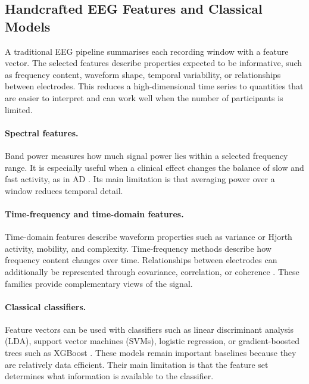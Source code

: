 \subsection{Handcrafted EEG Features and Classical Models}\label{sec:bg_classical}

A traditional EEG pipeline summarises each recording window with a feature vector. The selected features describe properties expected to be informative, such as frequency content, waveform shape, temporal variability, or relationships between electrodes. This reduces a high-dimensional time series to quantities that are easier to interpret and can work well when the number of participants is limited.

\paragraph{Spectral features.} Band power measures how much signal power lies within a selected frequency range. It is especially useful when a clinical effect changes the balance of slow and fast activity, as in AD \parencite{jeongEEGDynamicsAlzheimers2004}. Its main limitation is that averaging power over a window reduces temporal detail.

\paragraph{Time-frequency and time-domain features.} Time-domain features describe waveform properties such as variance or Hjorth activity, mobility, and complexity. Time-frequency methods describe how frequency content changes over time. Relationships between electrodes can additionally be represented through covariance, correlation, or coherence \parencite{hjorthEEGAnalysisBased1970,dehaanFunctionalNeuralNetwork2009}. These families provide complementary views of the signal.

\paragraph{Classical classifiers.} Feature vectors can be used with classifiers such as linear discriminant analysis (LDA), support vector machines (SVMs), logistic regression, or gradient-boosted trees such as XGBoost \parencite{chenXGBoostScalableTree2016}. These models remain important baselines because they are relatively data efficient. Their main limitation is that the feature set determines what information is available to the classifier.

